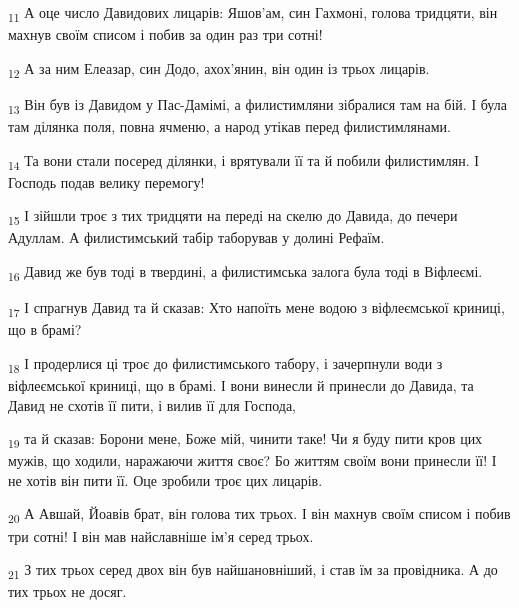 \begin{tcolorbox}
\textsubscript{11} А оце число Давидових лицарів: Яшов'ам, син Гахмоні, голова тридцяти, він махнув своїм списом і побив за один раз три сотні!
\end{tcolorbox}
\begin{tcolorbox}
\textsubscript{12} А за ним Елеазар, син Додо, ахох'янин, він один із трьох лицарів.
\end{tcolorbox}
\begin{tcolorbox}
\textsubscript{13} Він був із Давидом у Пас-Дамімі, а филистимляни зібралися там на бій. І була там ділянка поля, повна ячменю, а народ утікав перед филистимлянами.
\end{tcolorbox}
\begin{tcolorbox}
\textsubscript{14} Та вони стали посеред ділянки, і врятували її та й побили филистимлян. І Господь подав велику перемогу!
\end{tcolorbox}
\begin{tcolorbox}
\textsubscript{15} І зійшли троє з тих тридцяти на переді на скелю до Давида, до печери Адуллам. А филистимський табір таборував у долині Рефаїм.
\end{tcolorbox}
\begin{tcolorbox}
\textsubscript{16} Давид же був тоді в твердині, а филистимська залога була тоді в Віфлеємі.
\end{tcolorbox}
\begin{tcolorbox}
\textsubscript{17} І спрагнув Давид та й сказав: Хто напоїть мене водою з віфлеємської криниці, що в брамі?
\end{tcolorbox}
\begin{tcolorbox}
\textsubscript{18} І продерлися ці троє до филистимського табору, і зачерпнули води з віфлеємської криниці, що в брамі. І вони винесли й принесли до Давида, та Давид не схотів її пити, і вилив її для Господа,
\end{tcolorbox}
\begin{tcolorbox}
\textsubscript{19} та й сказав: Борони мене, Боже мій, чинити таке! Чи я буду пити кров цих мужів, що ходили, наражаючи життя своє? Бо життям своїм вони принесли її! І не хотів він пити її. Оце зробили троє цих лицарів.
\end{tcolorbox}
\begin{tcolorbox}
\textsubscript{20} А Авшай, Йоавів брат, він голова тих трьох. І він махнув своїм списом і побив три сотні! І він мав найславніше ім'я серед трьох.
\end{tcolorbox}
\begin{tcolorbox}
\textsubscript{21} З тих трьох серед двох він був найшановніший, і став їм за провідника. А до тих трьох не досяг.
\end{tcolorbox}
